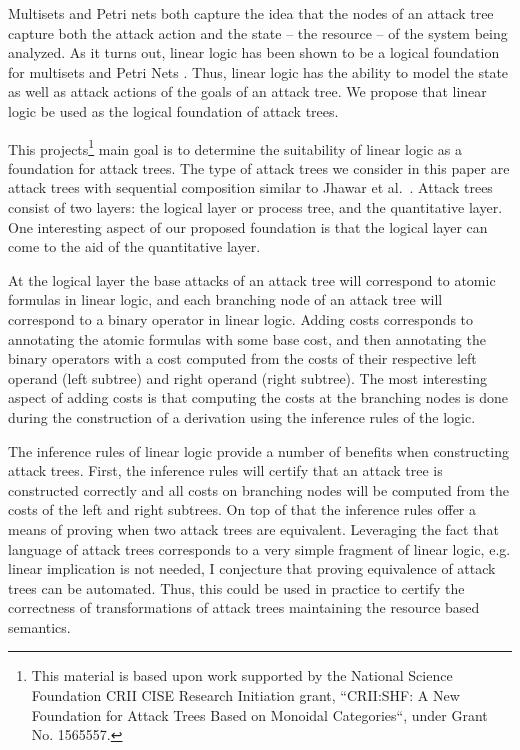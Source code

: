 \documentclass{llncs}
\begin{document}
Multisets and Petri nets both capture the idea that the nodes of an
attack tree capture both the attack action and the state -- the
resource -- of the system being analyzed. As it turns out, linear
logic has been shown to be a logical foundation for multisets
\cite{Tzouvaras:1998} and Petri Nets \cite{Brown:1991}.  Thus, linear
logic has the ability to model the state as well as attack actions of
the goals of an attack tree.  We propose that linear logic be used as
the logical foundation of attack trees.

This projects\footnote{This material is based upon work supported by
  the National Science Foundation CRII CISE Research Initiation grant,
  ``CRII:SHF: A New Foundation for Attack Trees Based on Monoidal
  Categories``, under Grant No. 1565557.} main goal is to determine
the suitability of linear logic as a foundation for attack trees.  The
type of attack trees we consider in this paper are attack trees with
sequential composition similar to Jhawar et al.~\cite{Jhawar:2015}.
Attack trees consist of two layers: the logical layer or process tree,
and the quantitative layer.  One interesting aspect of our proposed
foundation is that the logical layer can come to the aid of the
quantitative layer.

At the logical layer the base attacks of an attack tree will
correspond to atomic formulas in linear logic, and each branching node
of an attack tree will correspond to a binary operator in linear
logic.  Adding costs corresponds to annotating the atomic formulas
with some base cost, and then annotating the binary operators with a
cost computed from the costs of their respective left operand (left
subtree) and right operand (right subtree).  The most interesting
aspect of adding costs is that computing the costs at the branching
nodes is done during the construction of a derivation using the
inference rules of the logic.

The inference rules of linear logic provide a number of benefits when
constructing attack trees.  First, the inference rules will certify
that an attack tree is constructed correctly and all costs on
branching nodes will be computed from the costs of the left and right
subtrees.  On top of that the inference rules offer a means of proving
when two attack trees are equivalent. Leveraging the fact that
language of attack trees corresponds to a very simple fragment of
linear logic, e.g. linear implication is not needed, I conjecture
that proving equivalence of attack trees can be automated.  Thus, this
could be used in practice to certify the correctness of
transformations of attack trees maintaining the resource based
semantics.
\end{document}
